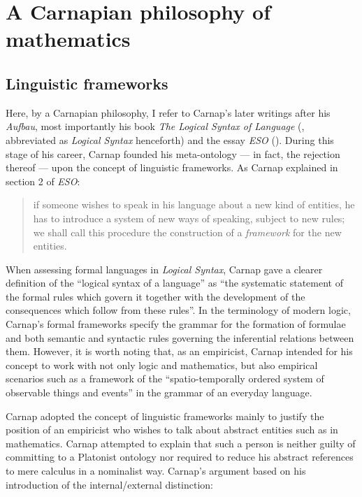 \documentclass[12pt]{article}
\theoremstyle{plain}
\theoremstyle{definition}
\begin{document}
\section{A Carnapian philosophy of mathematics}

\subsection{Linguistic frameworks}

Here, by a Carnapian philosophy, I refer to Carnap's later writings after his \emph{Aufbau}, most importantly his book \emph{The Logical Syntax of Language} (\cite{logical-syntax}, abbreviated as \emph{Logical Syntax} henceforth) and the essay \textit{ESO} (\cite{carnap-eso}). During this stage of his career, Carnap founded his meta-ontology --- in fact, the rejection thereof --- upon the concept of linguistic frameworks. As Carnap explained in section 2 of \emph{ESO}:

\begin{quote}
	if someone wishes to speak in his language about a new kind of entities, he has to introduce a system of new ways of speaking, subject to new rules; we shall call this procedure the construction of a \emph{framework} for the new entities.
\end{quote}

When assessing formal languages in \emph{Logical Syntax}, Carnap gave a clearer definition of the ``logical syntax of a language'' as ``the systematic statement of the formal rules which govern it together with the development of the consequences which follow from these rules''. In the terminology of modern logic, Carnap's formal frameworks specify the grammar for the formation of formulae and both semantic and syntactic rules governing the inferential relations between them. However, it is worth noting that, as an empiricist, Carnap intended for his concept to work with not only logic and mathematics, but also empirical scenarios such as a framework of the ``spatio-temporally ordered system of observable things and events'' in the grammar of an everyday language.

Carnap adopted the concept of linguistic frameworks mainly to justify the position of an empiricist who wishes to talk about abstract entities such as in mathematics. Carnap attempted to explain that such a person is neither guilty of committing to a Platonist ontology nor required to reduce his abstract references to mere calculus in a nominalist way. Carnap's argument based on his introduction of the internal/external distinction:
\end{document}

